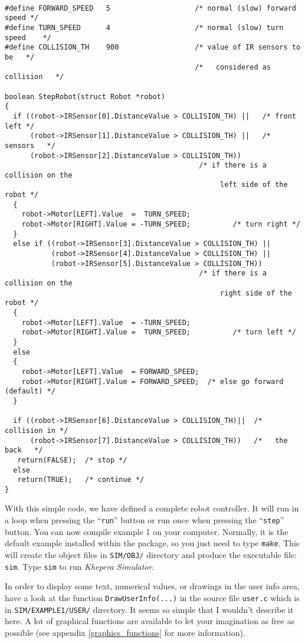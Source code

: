 \documentclass[a4paper,twoside]{article}
\begin{document}
\begin{verbatim}

#define FORWARD_SPEED   5                    /* normal (slow) forward speed */
#define TURN_SPEED      4                    /* normal (slow) turn speed    */
#define COLLISION_TH    900                  /* value of IR sensors to be   */
                                             /*   considered as collision   */

boolean StepRobot(struct Robot *robot)
{
  if ((robot->IRSensor[0].DistanceValue > COLLISION_TH) ||   /* front left */
      (robot->IRSensor[1].DistanceValue > COLLISION_TH) ||   /*  sensors   */
      (robot->IRSensor[2].DistanceValue > COLLISION_TH))
                                              /* if there is a collision on the
                                                   left side of the robot */
  {
    robot->Motor[LEFT].Value  =  TURN_SPEED;
    robot->Motor[RIGHT].Value = -TURN_SPEED;          /* turn right */
  }
  else if ((robot->IRSensor[3].DistanceValue > COLLISION_TH) ||
           (robot->IRSensor[4].DistanceValue > COLLISION_TH) ||
           (robot->IRSensor[5].DistanceValue > COLLISION_TH))
                                              /* if there is a collision on the
                                                   right side of the robot */
  {
    robot->Motor[LEFT].Value  = -TURN_SPEED;
    robot->Motor[RIGHT].Value =  TURN_SPEED;          /* turn left */
  }
  else 
  {
    robot->Motor[LEFT].Value  = FORWARD_SPEED;
    robot->Motor[RIGHT].Value = FORWARD_SPEED;  /* else go forward (default) */
  }

  if ((robot->IRSensor[6].DistanceValue > COLLISION_TH)||  /* collision in */
      (robot->IRSensor[7].DistanceValue > COLLISION_TH))   /*   the back   */
   return(FALSE);  /* stop */
  else
   return(TRUE);   /* continue */
}
\end{verbatim}

With this simple code, we have defined a complete robot controller. It will
run in a loop when pressing the ``{\tt run}'' button or run once when pressing
the ``{\tt step}'' button. You can now compile example 1 on your computer.
Normally, it is the default example installed within the package, so you just
need to type {\tt make}. This will create the object files in {\tt SIM/OBJ/}
directory and produce the executable file: {\tt sim}. Type {\tt sim} to run
{\em Khepera Simulator}.

In order to display some text, numerical values, or drawings in the user info
area, have a look at the function {\tt DrawUserInfo(...)} in the source file
{\tt user.c} which is in {\tt SIM/EXAMPLE1/USER/} directory. It seems so
simple that I wouldn't describe it here. A lot of graphical functions are
available to let your imagination as free as possible (see appendix
\ref{graphics_functions} for more information).
\end{document}
